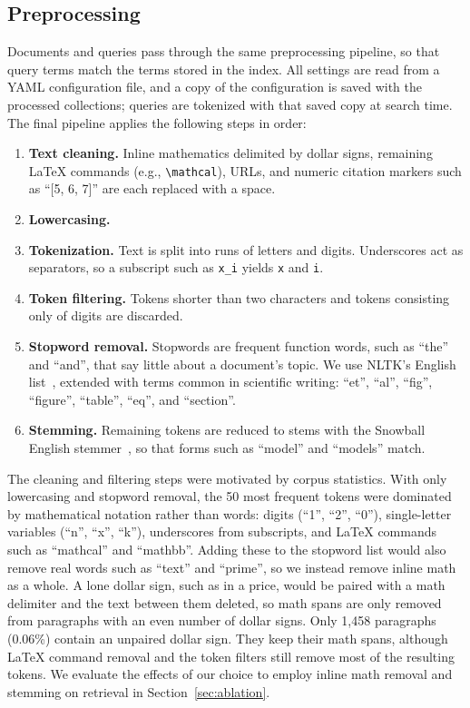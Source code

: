 \documentclass[sigconf,nonacm]{acmart}
\begin{document}
\subsection{Preprocessing}
\label{sec:preprocessing}

Documents and queries pass through the same preprocessing pipeline, so
that query terms match the terms stored in the index. All settings are
read from a YAML configuration file, and a copy of the configuration is
saved with the processed collections; queries are tokenized with that
saved copy at search time. The final pipeline applies the following
steps in order:

\begin{enumerate}
  \item \textbf{Text cleaning.} Inline mathematics delimited by dollar
    signs, remaining \LaTeX{} commands (e.g., \texttt{\textbackslash mathcal}),
    URLs, and numeric citation markers such as ``[5, 6, 7]'' are each
    replaced with a space.
  \item \textbf{Lowercasing.}
  \item \textbf{Tokenization.} Text is split into runs of letters and
    digits. Underscores act as separators, so a subscript such as
    \texttt{x\_i} yields \texttt{x} and \texttt{i}.
  \item \textbf{Token filtering.} Tokens shorter than two characters and
    tokens consisting only of digits are discarded.
  \item \textbf{Stopword removal.} Stopwords are frequent function words,
    such as ``the'' and ``and'', that say little about a document's topic.
    We use NLTK's English list~\cite{bird2009nltk}, extended with terms
    common in scientific writing: ``et'', ``al'', ``fig'', ``figure'',
    ``table'', ``eq'', and ``section''.
  \item \textbf{Stemming.} Remaining tokens are reduced to stems with the
    Snowball English stemmer~\cite{porter2001snowball}, so that forms
    such as ``model'' and ``models'' match.
\end{enumerate}

The cleaning and filtering steps were motivated by corpus statistics.
With only lowercasing and stopword removal, the 50 most frequent tokens
were dominated by mathematical notation rather than words: digits
(``1'', ``2'', ``0''), single-letter variables (``n'', ``x'', ``k''),
underscores from subscripts, and \LaTeX{} commands such as ``mathcal''
and ``mathbb''. Adding these to the stopword list would also remove real
words such as ``text'' and ``prime'', so we instead remove inline math as
a whole. A lone dollar sign, such as in a price, would be paired with a
math delimiter and the text between them deleted, so math spans are only
removed from paragraphs with an even number of dollar signs. Only 1,458
paragraphs (0.06\%) contain an unpaired dollar sign. They keep their math
spans, although \LaTeX{} command removal and the token filters still
remove most of the resulting tokens. We evaluate the effects of our choice
to employ inline math removal and stemming on retrieval in Section~\ref{sec:ablation}.
\end{document}
